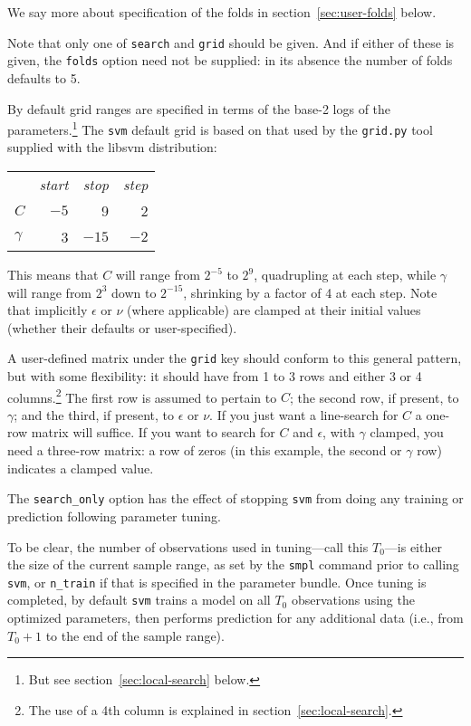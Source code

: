 \documentclass{article}
\begin{document}
We say more about specification of the folds in
section~\ref{sec:user-folds} below.

Note that only one of \texttt{search} and \texttt{grid} should be
given. And if either of these is given, the \texttt{folds} option
need not be supplied: in its absence the number of folds defaults to
5.

By default grid ranges are specified in terms of the base-2 logs of
the parameters.\footnote{But see section~\ref{sec:local-search}
  below.}  The \texttt{svm} default grid is based on that used by the
\texttt{grid.py} tool supplied with the \textsf{libsvm} distribution:
\begin{center}
\begin{tabular}{lrrr}
 & \textit{start} & \textit{stop} & \textit{step} \\[2pt]
$C$ & $-5$ & 9 & 2 \\
$\gamma$ & 3 & $-15$ & $-2$ 
\end{tabular}
\end{center}

This means that $C$ will range from $2^{-5}$ to $2^9$, quadrupling at
each step, while $\gamma$ will range from $2^3$ down to $2^{-15}$,
shrinking by a factor of 4 at each step. Note that implicitly
$\epsilon$ or $\nu$ (where applicable) are clamped at their initial
values (whether their defaults or user-specified).

A user-defined matrix under the \texttt{grid} key should conform to
this general pattern, but with some flexibility: it should have from 1
to 3 rows and either 3 or 4 columns.\footnote{The use of a 4th column
  is explained in section~\ref{sec:local-search}.} The first row is
assumed to pertain to $C$; the second row, if present, to $\gamma$;
and the third, if present, to $\epsilon$ or $\nu$. If you just want a
line-search for $C$ a one-row matrix will suffice.  If you want to
search for $C$ and $\epsilon$, with $\gamma$ clamped, you need a
three-row matrix: a row of zeros (in this example, the second or
$\gamma$ row) indicates a clamped value.

The \texttt{search\_only} option has the effect of stopping
\texttt{svm} from doing any training or prediction following parameter
tuning.

To be clear, the number of observations used in tuning---call this
$T_0$---is either the size of the current sample range, as set by the
\texttt{smpl} command prior to calling \texttt{svm}, or
\texttt{n\_train} if that is specified in the parameter bundle. Once
tuning is completed, by default \texttt{svm} trains a model on all
$T_0$ observations using the optimized parameters, then performs
prediction for any additional data (i.e., from $T_0 + 1$ to the end of
the sample range).
\end{document}
